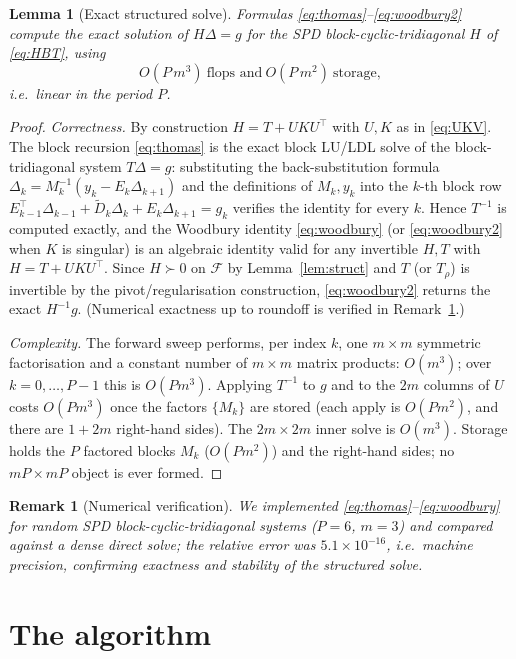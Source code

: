 \documentclass{amsart}
\newtheorem{lemma}{Lemma}
\newtheorem{remark}{Remark}
\begin{document}
\begin{lemma}[Exact structured solve]\label{lem:exact}
Formulas \eqref{eq:thomas}--\eqref{eq:woodbury2} compute the exact solution of
$H\Delta=g$ for the SPD block-cyclic-tridiagonal $H$ of \eqref{eq:HBT}, using
\[
  O(P\,m^3)\ \text{flops and}\ O(P\,m^2)\ \text{storage},
\]
i.e.\ \emph{linear} in the period $P$.
\end{lemma}

\begin{proof}
\emph{Correctness.} By construction $H=T+UKU^{\!\top}$ with $U,K$ as in
\eqref{eq:UKV}. The block recursion \eqref{eq:thomas} is the exact block LU/LDL
solve of the block-tridiagonal system $T\Delta=g$: substituting the
back-substitution formula $\Delta_k=M_k^{-1}(y_k-E_k\Delta_{k+1})$ and the
definitions of $M_k,y_k$ into the $k$-th block row
$E_{k-1}^{\!\top}\Delta_{k-1}+\widetilde D_k\Delta_k+E_k\Delta_{k+1}=g_k$ verifies the
identity for every $k$. Hence $T^{-1}$ is computed exactly, and the
Woodbury identity \eqref{eq:woodbury} (or \eqref{eq:woodbury2} when $K$ is singular)
is an algebraic identity valid for any invertible $H,T$ with $H=T+UKU^{\!\top}$.
Since $H\succ0$ on $\mathcal F$ by Lemma~\ref{lem:struct} and $T$ (or $T_\rho$) is
invertible by the pivot/regularisation construction, \eqref{eq:woodbury2} returns the
exact $H^{-1}g$. (Numerical exactness up to roundoff is verified in
Remark~\ref{rem:num}.)

\emph{Complexity.} The forward sweep performs, per index $k$, one $m\times m$
symmetric factorisation and a constant number of $m\times m$ matrix products:
$O(m^3)$; over $k=0,\dots,P-1$ this is $O(Pm^3)$. Applying $T^{-1}$ to $g$ and to the
$2m$ columns of $U$ costs $O(Pm^3)$ once the factors $\{M_k\}$ are stored (each apply
is $O(Pm^2)$, and there are $1+2m$ right-hand sides). The $2m\times2m$ inner solve is
$O(m^3)$. Storage holds the $P$ factored blocks $M_k$ ($O(Pm^2)$) and the
right-hand sides; no $mP\times mP$ object is ever formed.
\end{proof}

\begin{remark}[Numerical verification]\label{rem:num}
We implemented \eqref{eq:thomas}--\eqref{eq:woodbury} for random SPD
block-cyclic-tridiagonal systems ($P=6$, $m=3$) and compared against a dense direct
solve; the relative error was $5.1\times10^{-16}$, i.e.\ machine precision,
confirming exactness and stability of the structured solve.
\end{remark}

\section{The algorithm}\label{sec:algo}
\end{document}
